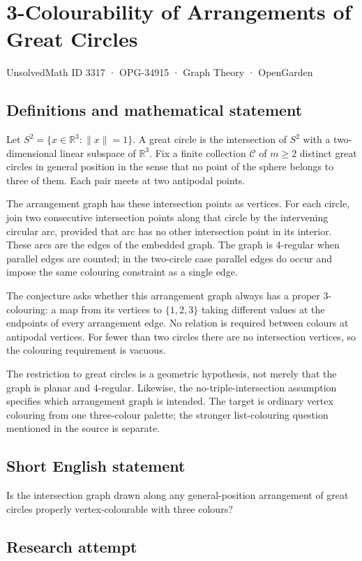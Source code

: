 \documentclass[11pt,a4paper]{article}
\begin{document}
\section*{3-Colourability of Arrangements of Great Circles}\label{3317}
{\small UnsolvedMath ID 3317 · OPG-34915 · Graph Theory · OpenGarden}
\subsection{Definitions and mathematical statement}
Let $S^2=\{x\in\mathbb R^3:\|x\|=1\}$. A great circle is the
intersection of $S^2$ with a two-dimensional linear subspace of
$\mathbb R^3$. Fix a finite collection $\mathcal C$ of $m\ge2$
distinct great circles in general position in the sense that no
point of the sphere belongs to three of them. Each pair meets at
two antipodal points.

The arrangement graph has these intersection points as vertices.
For each circle, join two consecutive intersection points along
that circle by the intervening circular arc, provided that arc has
no other intersection point in its interior. These arcs are the
edges of the embedded graph. The graph is 4-regular when parallel
edges are counted; in the two-circle case parallel edges do occur
and impose the same colouring constraint as a single edge.

The conjecture asks whether this arrangement graph always has a
proper 3-colouring: a map from its vertices to $\{1,2,3\}$ taking
different values at the endpoints of every arrangement edge.
No relation is required between colours at antipodal vertices.
For fewer than two circles there are no intersection vertices,
so the colouring requirement is vacuous.

The restriction to great circles is a geometric hypothesis, not
merely that the graph is planar and 4-regular. Likewise, the
no-triple-intersection assumption specifies which arrangement graph
is intended. The target is ordinary vertex colouring from one
three-colour palette; the stronger list-colouring question mentioned
in the source is separate.
\subsection{Short English statement}
Is the intersection graph drawn along any general-position arrangement of great circles properly vertex-colourable with three colours?
\subsection{Research attempt}
\end{document}
